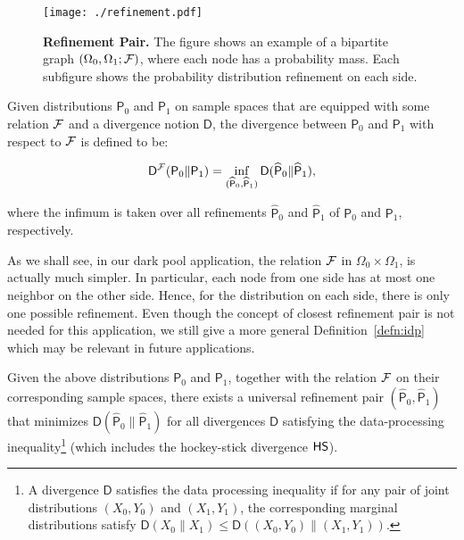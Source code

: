 \begin{figure}[hbt!]
    \centering
    \texttt{[image: ./refinement.pdf]}  %
    \caption{\textbf{Refinement Pair.} \textnormal{The figure
		shows an example of a bipartite graph $(\Omega_0, \Omega_1; \mathcal {F})$, where each node has a probability mass.  Each subfigure shows
		the probability distribution refinement on each side.}}
    \label{fig:refinement}
\end{figure}



\begin{definition}
Given distributions $\mathsf{P}_0$ and $\mathsf{P}_1$
on sample spaces that are equipped with some relation $\mathcal {F}$
and a divergence notion $\mathsf{D}$,
the divergence between $\mathsf{P}_0$ and $\mathsf{P}_1$ with respect to $\mathcal {F}$
is defined to be:

$$\mathsf{D}^{\mathcal {F}}(\mathsf{P}_0 \| \mathsf{P}_1) =
\inf_{(\widehat{\mathsf{P}}_0, \widehat{\mathsf{P}}_1)} \mathsf{D}(\widehat{\mathsf{P}}_0 \| \widehat{\mathsf{P}}_1),$$

where the infimum is taken over all refinements 
$\widehat{\mathsf{P}}_0$ and $\widehat{\mathsf{P}}_1$
of $\mathsf{P}_0$ and $\mathsf{P}_1$, respectively.
\end{definition}

\begin{remark}
As we shall see, in our dark pool application,
the relation $\mathcal {F}$ in $\Omega_0 \times \Omega_1$,
is actually much simpler.
In particular, each node from one side
has at most one neighbor on the other side.
Hence, for the distribution on each side, there is only one possible
refinement.
Even though the concept of closest refinement pair is not needed for this application,
we still give a more general Definition~\ref{defn:idp} which may be relevant
in future applications.
\end{remark}


\begin{fact}
Given the above distributions 
 $\mathsf{P}_0$ and $\mathsf{P}_1$, together with the relation $\mathcal {F}$ on
their corresponding sample spaces,
there exists a universal refinement pair
$(\widehat{\mathsf{P}}_0, \widehat{\mathsf{P}}_1)$ that minimizes
$\mathsf{D}(\widehat{\mathsf{P}}_0 \| \widehat{\mathsf{P}}_1)$ for all
divergences $\mathsf{D}$ satisfying the data-processing 
inequality\footnote{
A divergence $\mathsf{D}$ satisfies
the data processing inequality if for 
any pair of joint distributions $(X_0, Y_0)$ and $(X_1, Y_1)$,
the corresponding marginal distributions satisfy
$\mathsf{D}(X_0 \| X_1)
\leq \mathsf{D}((X_0, Y_0) \| (X_1, Y_1))$.
} 
(which includes the hockey-stick divergence ${\sf HS}$).
\end{fact}




